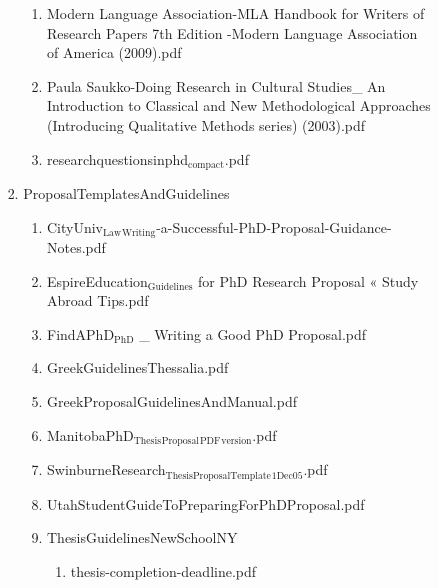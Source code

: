 \documentclass[11pt]{article}
\begin{document}
\begin{enumerate}
\begin{enumerate}
\begin{enumerate}
\begin{enumerate}
\begin{enumerate}
\item Modern Language Association-MLA Handbook for Writers of Research Papers 7th Edition  -Modern Language Association of America (2009).pdf
\label{sec-1-1-1-1-8-8-13-9-3-5}

\item Paula Saukko-Doing Research in Cultural Studies\_ An Introduction to Classical and New Methodological Approaches (Introducing Qualitative Methods series) (2003).pdf
\label{sec-1-1-1-1-8-8-13-9-3-6}

\item researchquestionsinphd$_{\text{compact}}$.pdf
\label{sec-1-1-1-1-8-8-13-9-3-7}
\end{enumerate}

\item ProposalTemplatesAndGuidelines
\label{sec-1-1-1-1-8-8-13-9-4}
\begin{enumerate}
\item CityUniv$_{\text{Law}}$$_{\text{Writing}}$-a-Successful-PhD-Proposal-Guidance-Notes.pdf
\label{sec-1-1-1-1-8-8-13-9-4-1}

\item EspireEducation$_{\text{Guidelines}}$ for PhD Research Proposal « Study Abroad Tips.pdf
\label{sec-1-1-1-1-8-8-13-9-4-2}

\item FindAPhD$_{\text{PhD}}$ \_ Writing a Good PhD Proposal.pdf
\label{sec-1-1-1-1-8-8-13-9-4-3}

\item GreekGuidelinesThessalia.pdf
\label{sec-1-1-1-1-8-8-13-9-4-4}

\item GreekProposalGuidelinesAndManual.pdf
\label{sec-1-1-1-1-8-8-13-9-4-5}

\item ManitobaPhD$_{\text{Thesis}}$$_{\text{Proposal}}$$_{\text{PDF}}$$_{\text{version}}$.pdf
\label{sec-1-1-1-1-8-8-13-9-4-6}

\item SwinburneResearch$_{\text{ThesisProposalTemplate}}$$_{\text{1Dec05}}$.pdf
\label{sec-1-1-1-1-8-8-13-9-4-7}

\item UtahStudentGuideToPreparingForPhDProposal.pdf
\label{sec-1-1-1-1-8-8-13-9-4-8}

\item ThesisGuidelinesNewSchoolNY
\label{sec-1-1-1-1-8-8-13-9-4-9}
\begin{enumerate}
\item thesis-completion-deadline.pdf
\label{sec-1-1-1-1-8-8-13-9-4-9-1}


\end{enumerate}
\end{enumerate}
\end{enumerate}
\end{enumerate}
\end{enumerate}
\end{enumerate}
\end{document}
